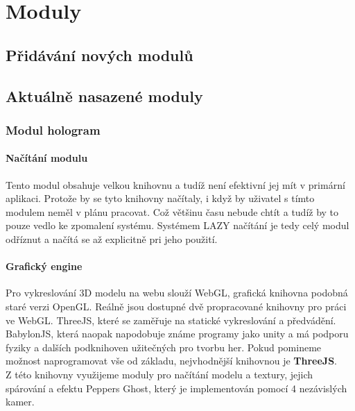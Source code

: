 \chapter{Moduly}

\section{Přidávání nových modulů}

\section{Aktuálně nasazené moduly}



\subsection{Modul hologram}

\subsubsection{Načítání modulu}
Tento modul obsahuje velkou knihovnu a tudíž není efektivní jej mít v primární aplikaci.
Protože by se tyto knihovny načítaly, i když by uživatel s tímto modulem neměl v plánu pracovat.
Což většinu času nebude chtít a tudíž by to pouze vedlo ke zpomalení systému.
Systémem LAZY načítání je tedy celý modul odříznut a načítá se až explicitně pri jeho použití.

\subsubsection{Grafický engine}
Pro vykreslování 3D modelu na webu slouží WebGL, grafická knihovna podobná staré verzi OpenGL.
Reálně jsou dostupné dvě propracované knihovny pro práci ve WebGL.
ThreeJS, které se zaměřuje na statické vykreslování a předvádění.
BabylonJS, která naopak napodobuje známe programy jako unity a má podporu
fyziky a dalších podknihoven užitečných pro tvorbu her.
Pokud pomineme možnost naprogramovat vše od základu, nejvhodnější knihovnou 
je \textbf{ThreeJS}.\\
Z této knihovny využijeme moduly pro načítání modelu a textury, jejich spárování a
efektu Peppers Ghost, který je implementován pomocí 4 nezávislých kamer.


